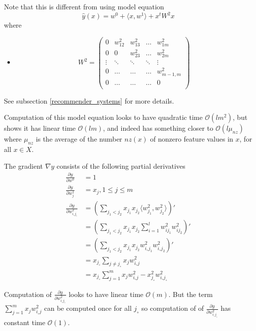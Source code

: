 \documentclass[14pt, reqno]{amsart}
\theoremstyle{definition}
\begin{document}
Note that this is different from using model equation
\begin{equation}
\hat{y}(x) = w^0 + \langle x, w^1 \rangle + x^t W^2 x
\end{equation}
where
\begin{itemize}
\item 
$$
W^2 = \left( \begin{array}{ccccc}
0 & w_{12}^2 & w_{13}^2 & \dots & w_{1m}^2 \\
0 & 0 & w_{23}^2 & \dots & w_{2m}^2 \\
\vdots & \ddots & \ddots & \ddots & \vdots \\
0 & \dots & \dots & \dots & w_{m-1, m}^2 \\
0 & \dots & \dots & \dots & 0 \\
\end{array} \right)
$$
\end{itemize}
See subsection \ref{recommender_systems} for more details.

Computation of this model equation looks to have quadratic time $\mathcal{O}(lm^2)$, but \cite[lemma 3.1]{factorization_machines} shows it has linear time $\mathcal{O}(lm)$, and indeed has something closer to $\mathcal{O}(l \mu_{nz})$ where $\mu_{nz}$ is the average of the number $nz(x)$ of nonzero feature values in $x$, for all $x \in X$.

The gradient $\nabla y$ consists of the following partial derivatives
\begin{align*}
\frac{\partial y}{\partial w^0} & = 1 \\
\frac{\partial y}{\partial w_j^1} & = x_j, 1 \leq j \leq m \\
\frac{\partial y}{\partial w_{i_{\circ} j_{\circ}}^2} & = \left( \sum\limits_{j_1 < j_2} x_{j_1} x_{j_2} \langle w_{j_1}^2, w_{j_2}^2 \rangle \right)' \\
 & = \left( \sum\limits_{j_1 < j_2} x_{j_1} x_{j_2} \sum\limits_{i = 1}^l w_{i j_1}^2 w_{i j_2}^2 \right)' \\
 & = \left( \sum\limits_{j_1 < j_2} x_{j_1} x_{j_2} w_{i_{\circ} j_1}^2 w_{i_{\circ} j_2}^2 \right)' \\
 & = x_{j_{\circ}} \sum\limits_{j \neq j_{\circ}} x_j w_{i_{\circ} j}^2 \\
 & = x_{j_{\circ}} \sum\limits_{j = 1}^m x_j w_{i_{\circ} j}^2 - x_{j_{\circ}}^2 w_{i_{\circ} j_{\circ}}^2
\end{align*}

Computation of $\frac{\partial y}{\partial w_{i_{\circ} j_{\circ}}^2}$ looks to have linear time $\mathcal{O}(m)$. But the term $\sum\limits_{j = 1}^m x_j w_{i_{\circ} j}^2$ can be computed once for all $j_{\circ}$ so computation of of $\frac{\partial y}{\partial w_{i_{\circ} j_{\circ}}^2}$ has constant time $\mathcal{O}(1)$.
\end{document}
